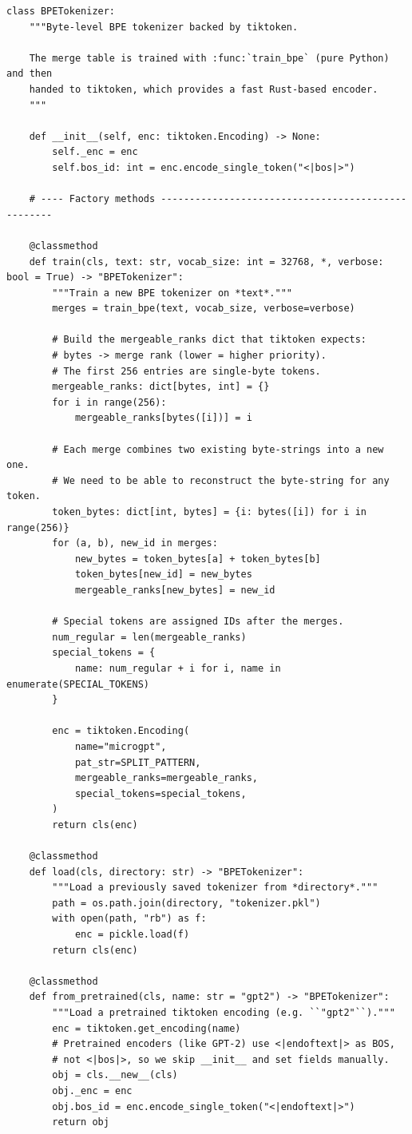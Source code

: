 \begin{lstlisting}
class BPETokenizer:
    """Byte-level BPE tokenizer backed by tiktoken.

    The merge table is trained with :func:`train_bpe` (pure Python) and then
    handed to tiktoken, which provides a fast Rust-based encoder.
    """

    def __init__(self, enc: tiktoken.Encoding) -> None:
        self._enc = enc
        self.bos_id: int = enc.encode_single_token("<|bos|>")

    # ---- Factory methods ---------------------------------------------------

    @classmethod
    def train(cls, text: str, vocab_size: int = 32768, *, verbose: bool = True) -> "BPETokenizer":
        """Train a new BPE tokenizer on *text*."""
        merges = train_bpe(text, vocab_size, verbose=verbose)

        # Build the mergeable_ranks dict that tiktoken expects:
        # bytes -> merge rank (lower = higher priority).
        # The first 256 entries are single-byte tokens.
        mergeable_ranks: dict[bytes, int] = {}
        for i in range(256):
            mergeable_ranks[bytes([i])] = i

        # Each merge combines two existing byte-strings into a new one.
        # We need to be able to reconstruct the byte-string for any token.
        token_bytes: dict[int, bytes] = {i: bytes([i]) for i in range(256)}
        for (a, b), new_id in merges:
            new_bytes = token_bytes[a] + token_bytes[b]
            token_bytes[new_id] = new_bytes
            mergeable_ranks[new_bytes] = new_id

        # Special tokens are assigned IDs after the merges.
        num_regular = len(mergeable_ranks)
        special_tokens = {
            name: num_regular + i for i, name in enumerate(SPECIAL_TOKENS)
        }

        enc = tiktoken.Encoding(
            name="microgpt",
            pat_str=SPLIT_PATTERN,
            mergeable_ranks=mergeable_ranks,
            special_tokens=special_tokens,
        )
        return cls(enc)

    @classmethod
    def load(cls, directory: str) -> "BPETokenizer":
        """Load a previously saved tokenizer from *directory*."""
        path = os.path.join(directory, "tokenizer.pkl")
        with open(path, "rb") as f:
            enc = pickle.load(f)
        return cls(enc)

    @classmethod
    def from_pretrained(cls, name: str = "gpt2") -> "BPETokenizer":
        """Load a pretrained tiktoken encoding (e.g. ``"gpt2"``)."""
        enc = tiktoken.get_encoding(name)
        # Pretrained encoders (like GPT-2) use <|endoftext|> as BOS,
        # not <|bos|>, so we skip __init__ and set fields manually.
        obj = cls.__new__(cls)
        obj._enc = enc
        obj.bos_id = enc.encode_single_token("<|endoftext|>")
        return obj


\end{lstlisting}
